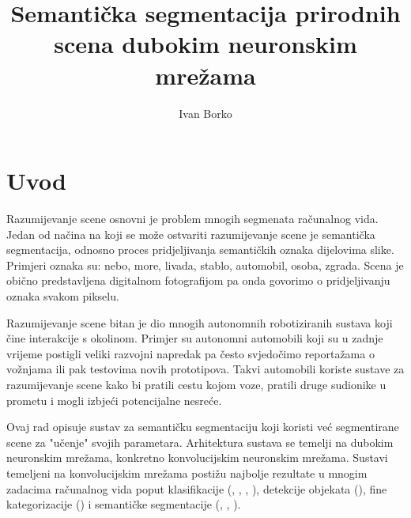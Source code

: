 \documentclass[times, utf8, diplomski, numeric]{fer}
\begin{document}

\title{Semantička segmentacija prirodnih scena dubokim neuronskim mrežama}

\author{Ivan Borko}

\maketitle

\izvornik

\zahvala{}

\tableofcontents

\chapter{Uvod}

Razumijevanje scene osnovni je problem mnogih segmenata računalnog vida. Jedan od načina na koji se može ostvariti razumijevanje scene je semantička segmentacija, odnosno proces pridjeljivanja semantičkih oznaka dijelovima slike. Primjeri oznaka su: nebo, more, livada, stablo, automobil, osoba, zgrada. Scena je obično predstavljena digitalnom fotografijom pa onda govorimo o pridjeljivanju oznaka svakom pikselu.

Razumijevanje scene bitan je dio mnogih autonomnih robotiziranih sustava koji čine interakcije s okolinom.
Primjer su autonomni automobili koji su u zadnje vrijeme postigli veliki razvojni napredak pa često svjedočimo reportažama o vožnjama ili pak testovima novih prototipova. Takvi automobili koriste sustave za razumijevanje scene kako bi pratili cestu kojom voze, pratili druge sudionike u prometu i mogli izbjeći potencijalne nesreće.

Ovaj rad opisuje sustav za semantičku segmentaciju koji koristi već segmentirane scene za "učenje" svojih parametara. Arhitektura sustava se temelji na dubokim neuronskim mrežama, konkretno konvolucijskim neuronskim mrežama. Sustavi temeljeni na konvolucijskim mrežama postižu najbolje rezultate  u mnogim zadacima računalnog vida poput klasifikacije (\cite{krizhevsky_imagenet}, \cite{googlenet}, \cite{vgg_net}, \cite{overfeat}), detekcije objekata (\cite{girshick2014rcnn}), fine kategorizacije (\cite{zhang14finegrained}) i semantičke segmentacije (\cite{farabet_pami}, \cite{long_shelhamer}, \cite{ChenPKMY14}).
\end{document}
